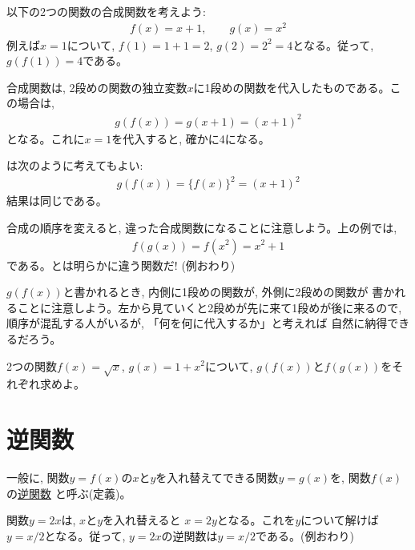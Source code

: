 \begin{exmpl} 以下の2つの関数の合成関数を考えよう:
\begin{eqnarray*}
f(x)=x+1,\quad\quad g(x)=x^2
\end{eqnarray*}
例えば$x=1$について, $f(1)=1+1=2$, $g(2)=2^2=4$となる。従って, $g(f(1))=4$である。

合成関数は, 2段めの関数の独立変数$x$に1段めの関数を代入したものである。この場合は, 
\begin{eqnarray}g(f(x))=g(x+1)=(x+1)^2\label{eq:gousei_kansu6}\end{eqnarray}
となる。これに$x=1$を代入すると, 確かに4になる。

は次のように考えてもよい:
\begin{eqnarray}g(f(x))=\{f(x)\}^2=(x+1)^2\end{eqnarray}
結果は同じである。

合成の順序を変えると, 違った合成関数になることに注意しよう。上の例では, 
\begin{eqnarray}f(g(x))=f(x^2)=x^2+1\label{eq:gousei_kansu7}\end{eqnarray}
である。とは明らかに違う関数だ!
(例おわり)\end{exmpl}\mv

$g(f(x))$と書かれるとき, 内側に1段めの関数が, 外側に2段めの関数が
書かれることに注意しよう。左から見ていくと2段めが先に来て1段めが後に来るので, 
順序が混乱する人がいるが, 「何を何に代入するか」と考えれば
自然に納得できるだろう。

\begin{q}\label{q:gouseikansu0} 2つの関数$f(x)=\sqrt{x}$, $g(x)=1+x^2$について, 
$g(f(x))$と$f(g(x))$をそれぞれ求めよ。
\end{q}
\hv


\section{逆関数}\label{sec_gyakukansu}

一般に, 関数$y=f(x)$の$x$と$y$を入れ替えてできる関数$y=g(x)$を, 
関数$f(x)$の\underline{逆関数} と呼ぶ(定義)。

\begin{exmpl}\label{exmpl:func_inv1} 関数$y=2x$は, $x$と$y$を入れ替えると
$x=2y$となる。これを$y$について解けば$y=x/2$となる。従って, 
$y=2x$の逆関数は$y=x/2$である。(例おわり)\end{exmpl}

